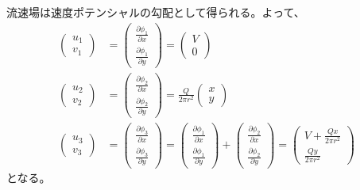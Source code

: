 \documentclass[a4paper]{jsarticle}
\begin{document}
\subsubsection{}
流速場は速度ポテンシャルの勾配として得られる。よって、
\begin{align}
  \begin{pmatrix}
    u_1 \\ v_1
  \end{pmatrix} &=
  \begin{pmatrix}
    \frac{\partial \phi_1}{\partial x} \\
    \frac{\partial \phi_1}{\partial y}
  \end{pmatrix} =
  \begin{pmatrix}
    V \\ 0
  \end{pmatrix} \\
  \begin{pmatrix}
    u_2 \\ v_2
  \end{pmatrix} &=
  \begin{pmatrix}
    \frac{\partial \phi_2}{\partial x} \\
    \frac{\partial \phi_2}{\partial y}
  \end{pmatrix} =
  \frac{Q}{2 \pi r^2}
  \begin{pmatrix}
    x \\ y
  \end{pmatrix} \\
  \begin{pmatrix}
    u_3 \\ v_3
  \end{pmatrix} &=
  \begin{pmatrix}
    \frac{\partial \phi_3}{\partial x} \\
    \frac{\partial \phi_3}{\partial y}
  \end{pmatrix} =
  \begin{pmatrix}
    \frac{\partial \phi_1}{\partial x} \\
    \frac{\partial \phi_1}{\partial y}
  \end{pmatrix} +
  \begin{pmatrix}
    \frac{\partial \phi_2}{\partial x} \\
    \frac{\partial \phi_2}{\partial y}
  \end{pmatrix} =
  \begin{pmatrix}
    V + \frac{Q x}{2 \pi r^2} \\
    \frac{Q y}{2 \pi r^2}
  \end{pmatrix}
\end{align}
となる。
\end{document}
